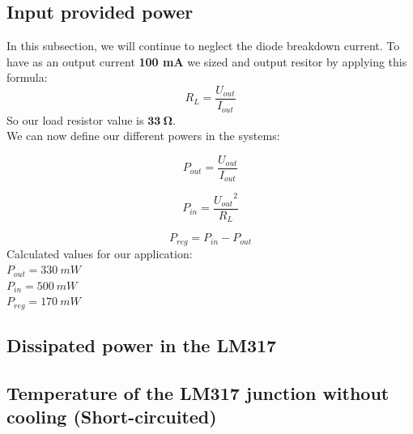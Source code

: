 \subsection{Input provided power} \label{ssec:num03}
{
In this subsection, we will continue to neglect the diode breakdown current. To have as an output current \textbf{100 mA} we sized and output resitor by applying this formula:
\begin{equation}
    R_L = \frac{U_{out}}{I_{out}}
\end{equation}
So our load resistor value is $ \mathbf{ 33 \ \boldsymbol{\Omega} } $. \\
We can now define our different powers in the systems:

\begin{equation}
    P_{out} = \frac{U_{out}}{I_{out}}
\end{equation}

\begin{equation}
    P_{in} = \frac{{U_{out}}^2}{R_{L}}
\end{equation}

\begin{equation}
    P_{reg} = P_{in} - P_{out}
\end{equation}
Calculated values for our application:\\
$ P_{out} = 330 \ mW $ \\
$ P_{in} = 500 \ mW $ \\
$ P_{reg} = 170 \ mW $ \\

}

\subsection{Dissipated power in the LM317} \label{ssec:num04}
{

}

\subsection{Temperature of the LM317 junction without cooling (Short-circuited)} \label{ssec:num05}
{

}

\clearpage